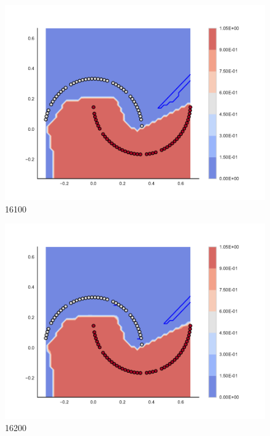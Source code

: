 \begin{subfigure}[b]{0.09\textwidth}
    \includegraphics[clip, trim=2.35cm 1.75cm 4.5cm 0cm,width=\textwidth]{img/convergence/16100.pdf}
    \caption{16100}
    \label{fig:convergence_16100}
\end{subfigure}
%
\begin{subfigure}[b]{0.09\textwidth}
    \includegraphics[clip, trim=2.35cm 1.75cm 4.5cm 0cm,width=\textwidth]{img/convergence/16200.pdf}
    \caption{16200}
    \label{fig:convergence_16200}
\end{subfigure}
%

